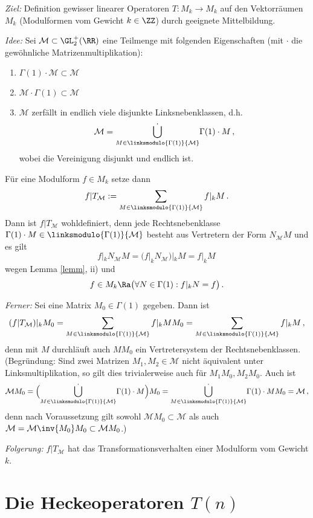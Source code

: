 \emph{Ziel:} Definition gewisser linearer Operatoren $T \colon M_k \to M_k$ auf den Vektorräumen $M_k$ (Modulformen vom Gewicht $k \in \ZZ$) durch geeignete Mittelbildung.

\emph{Idee:} Sei $\mathcal{M} \subset \GL_2^+(\RR)$ eine Teilmenge mit folgenden Eigenschaften (mit $\cdot$ die gewöhnliche Matrizenmultiplikation): \begin{enumerate}
\item $\Gamma (1) \cdot \mathcal M \subset \mathcal M$
\item $\mathcal M \cdot \Gamma(1) \subset \mathcal M$
\item $\mathcal M$ zerfällt in endlich viele disjunkte Linksnebenklassen, d.h.
\[
\mathcal M = \dot{\bigcup_{M \in \linksmodulo{\Gamma(1)}{\mathcal M}}} \Gamma(1) \cdot M
\,,
\]
wobei die Vereinigung disjunkt und endlich ist. 
\end{enumerate}
Für eine Modulform $f \in M_k$ setze dann
\[
f | T_{\mathcal M} := \sum_{M \in \linksmodulo{\Gamma(1)}{\mathcal M}} f|_k M
\,.
\]
Dann ist $f | T_{\mathcal M}$ wohldefiniert, denn jede Rechtsnebenklasse $\Gamma (1) \cdot M \in \linksmodulo{\Gamma(1)}{\mathcal M}$ besteht aus Vertretern der Form $N_{\mathcal M} M$ und es gilt
\[
f |_k N_{\mathcal M} M = (f |_k N_{\mathcal M}) |_k M = f |_k M
\,
\]
wegen Lemma \ref{lemm}, ii) und 
\[
f \in M_k \Ra \bigl( \forall N \in \Gamma(1) : f |_k N = f \bigr)
\,.
\]

\emph{Ferner:} Sei eine Matrix $M_0 \in \Gamma(1)$ gegeben. Dann ist 
\[
(f | T_{\mathcal M}) |_k M_0 = \sum_{M \in \linksmodulo{\Gamma(1)}{\mathcal M}} f |_k M M_0 = \sum_{M \in \linksmodulo{\Gamma(1)}{\mathcal M}} f |_k M
\,,
\]
denn mit $M$ durchläuft auch $MM_0$ ein Vertretersystem der Rechtsnebenklassen. (Begründung: Sind zwei Matrizen $M_1, M_2 \in \mathcal M$ nicht äquivalent unter Linksmultiplikation, so gilt dies trivialerweise auch für $M_1M_0, M_2M_0$. Auch ist
\[
\mathcal M M_0 = \Bigl( \dot{\bigcup_{M \in \linksmodulo{\Gamma(1)}{\mathcal M}}} \Gamma(1) \cdot M \Bigr) M_0 = \dot{\bigcup_{M \in \linksmodulo{\Gamma(1)}{\mathcal M}}} \Gamma(1) \cdot M M_0 = \mathcal M
\,,
\]
denn nach Voraussetzung gilt sowohl $\mathcal M M_0 \subset \mathcal M$ als auch $\mathcal M = \mathcal M \inv{M_0}M_0 \subset \mathcal M M_0$.)

\emph{Folgerung:} $f | T_{\mathcal M}$ hat das Transformationsverhalten einer Modulform vom Gewicht $k$.

\section{Die Heckeoperatoren $T(n)$}

